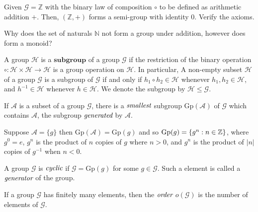 \begin{exmp}
 Given $\mathcal{G} = \mathbb{Z}$ with the binary law of composition $\circ$ to be defined as arithmetic addition $+$.
 Then, $(\mathbb{Z}, +)$ forms a semi-group with identity $0$. Verify the axioms.
\end{exmp}

\begin{question}
 Why does the set of naturals $\mathbb{N}$ not form a group under addition, however does form a monoid?
\end{question}

\begin{defn}[Subgroup]
	A group $\mathcal{H}$ is a $\textbf{subgroup}$ of a group $\mathcal{G}$ if the restriction of the binary operation
	$\circ : \mathcal{H} \times \mathcal{H} \to \mathcal{H}$ is a group operation on $\mathcal{H}$.
	In particular, A non-empty subset $\mathcal{H}$ of a group $\mathcal{G}$ is a subgroup of
	$\mathcal{G}$ if and only if $h_1 \circ h_2 \in \mathcal{H}$ whenever $h_1, h_2 \in \mathcal{H}$,
	and $h^{-1} \in \mathcal{H}$ whenever $h \in \mathcal{H}$. We denote the subgroup by $\mathcal{H} \leq \mathcal{G}$.
\end{defn}

\begin{defn}
	If $\mathcal{A}$ is a subset of a group $\mathcal{G}$, there is a $\emph{smallest}$ subgroup
	$\mbox{Gp}(\mathcal{A})$ of $\mathcal{G}$ which contains $\mathcal{A}$, the subgroup $\emph{generated}$
	by $\mathcal{A}$.
\end{defn}

\begin{exmp}
	Suppose $\mathcal{A}=\{g\}$ then $\mbox{Gp}(\mathcal{A})=\mbox{Gp}(g)$ and so
	$\mbox{Gp}(g) = \{ g^n : n \in \mathbb{Z} \}$, where $g^0 = e$, $g^n$ is the product of $n$ copies of $g$
	where $n>0$, and $g^n$ is the product of $|n|$ copies of $g^{-1}$ when $n<0$.
\end{exmp}

\begin{defn}
	A group $\mathcal{G}$ is $\emph{cyclic}$ if $\mathcal{G}=\mbox{Gp}(g)$ for some $g \in \mathcal{G}$.
	Such a element is called a $\emph{generator}$ of the group.
\end{defn}

\begin{defn}
	If a group $\mathcal{G}$ has finitely many elements, then the $\emph{order}$
	$o(\mathcal{G})$ is the number of elements of $\mathcal{G}$.
\end{defn}

